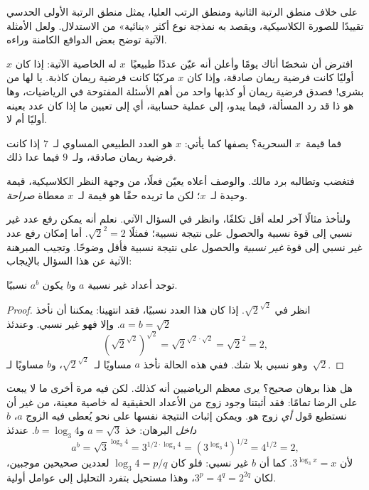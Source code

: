 \documentclass[../../../include/open-logic-section]{subfiles}
\begin{document}


على خلاف منطق الرتبة الثانية ومنطق الرتب العليا، يمثل منطق الرتبة
الأولى الحدسي تقييدًا للصورة الكلاسيكية، ويقصد به نمذجة نوع أكثر
«بنائية» من الاستدلال. ولعل الأمثلة الآتية توضح بعض الدوافع الكامنة
وراءه.

افترض أن شخصًا أتاك يومًا وأعلن أنه عيّن عددًا طبيعيًا~$x$ له الخاصية
الآتية: إذا كان $x$ أوليًا كانت فرضية ريمان صادقة، وإذا كان $x$ مركبًا
كانت فرضية ريمان كاذبة. يا لها من بشرى!{} فصدق فرضية ريمان أو كذبها
واحد من أهم الأسئلة المفتوحة في الرياضيات، وها هو ذا قد رد المسألة،
فيما يبدو، إلى عملية حسابية، أي إلى تعيين ما إذا كان عدد بعينه أوليًا
أم لا.

فما قيمة~$x$ السحرية؟ يصفها كما يأتي: $x$ هو العدد الطبيعي المساوي
لـ~$7$ إذا كانت فرضية ريمان صادقة، ولـ~$9$ فيما عدا ذلك.

فتغضب وتطالبه برد مالك. والوصف أعلاه يعيّن فعلًا، من وجهة النظر
الكلاسيكية، قيمة وحيدة لـ~$x$؛ لكن ما تريده حقًا هو قيمة لـ~$x$ معطاة
\emph{صراحة}.

ولنأخذ مثالًا آخر لعله أقل تكلفًا، وانظر في السؤال الآتي. نعلم أنه
يمكن رفع عدد غير نسبي إلى قوة نسبية والحصول على نتيجة نسبية؛ فمثلًا
$\sqrt{2}^2 = 2$. أما إمكان رفع عدد غير نسبي إلى قوة \emph{غير
نسبية} والحصول على نتيجة نسبية فأقل وضوحًا. وتجيب المبرهنة الآتية عن
هذا السؤال بالإيجاب:

\begin{thm}
توجد أعداد غير نسبية $a$ و$b$ يكون $a^b$ نسبيًا.
\end{thm}

\begin{proof}
انظر في $\sqrt{2}^{\sqrt{2}}$. إذا كان هذا العدد نسبيًا، فقد انتهينا:
يمكننا أن نأخذ $a = b = \sqrt{2}$. وإلا فهو غير نسبي. وعندئذ
\[
(\sqrt{2}^{\sqrt{2}})^{\sqrt{2}} = \sqrt{2}^{\sqrt{2} \cdot
  \sqrt{2}} = \sqrt{2}^2 = 2,
\]
وهو نسبي بلا شك. ففي هذه الحالة نأخذ $a$ مساويًا
لـ~$\sqrt{2}^{\sqrt{2}}$، و$b$ مساويًا لـ~$\sqrt 2$.
\end{proof}

هل هذا برهان صحيح؟ يرى معظم الرياضيين أنه كذلك. لكن فيه مرة أخرى ما
لا يبعث على الرضا تمامًا: فقد أثبتنا وجود زوج من الأعداد الحقيقية له
خاصية معينة، من غير أن نستطيع قول \emph{أي} زوج هو. ويمكن إثبات
النتيجة نفسها على نحو يُعطى فيه الزوج $a$، $b$ \emph{داخل} البرهان:
خذ $a = \sqrt{3}$ و$b = \log_3 4$. عندئذ
\[
a^b = \sqrt{3}^{\log_3 4} = 3^{1/2 \cdot \log_3 4} = (3^{\log_3
  4})^{1/2} = 4^{1/2}= 2,
\]
لأن $3^{\log_3 x} = x$. كما أن $b$ غير نسبي: فلو كان
$\log_3 4=p/q$ لعددين صحيحين موجبين، لكان $3^p=4^q=2^{2q}$، وهذا
مستحيل بتفرد التحليل إلى عوامل أولية.
\end{document}
